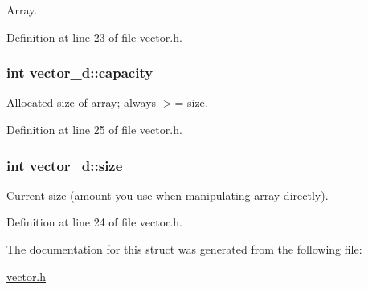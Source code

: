 Array. 



Definition at line 23 of file vector.h.

\hypertarget{structvector__d_acc924985e421a81b7acb5a2ee8eecfaa}{
\subsubsection[{capacity}]{\setlength{\rightskip}{0pt plus 5cm}int {\bf vector\_\-d::capacity}}}
\label{structvector__d_acc924985e421a81b7acb5a2ee8eecfaa}


Allocated size of array; always $>$= size. 



Definition at line 25 of file vector.h.

\hypertarget{structvector__d_a0267fa83b14889786ec36cdbe78a71b3}{
\subsubsection[{size}]{\setlength{\rightskip}{0pt plus 5cm}int {\bf vector\_\-d::size}}}
\label{structvector__d_a0267fa83b14889786ec36cdbe78a71b3}


Current size (amount you use when manipulating array directly). 



Definition at line 24 of file vector.h.



The documentation for this struct was generated from the following file:\begin{DoxyCompactItemize}
\item 
\hyperlink{vector_8h}{vector.h}\end{DoxyCompactItemize}
